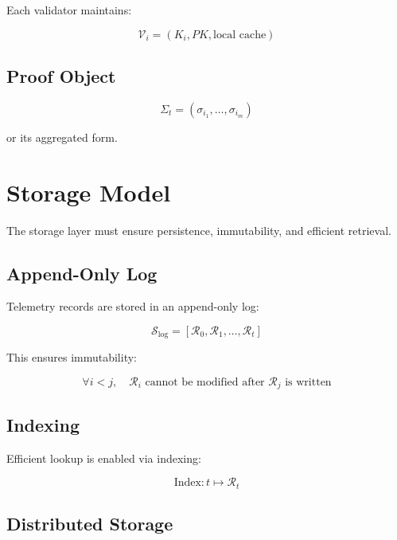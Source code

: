 Each validator maintains:

\begin{equation}
\mathcal{V}_i = (K_i, PK, \text{local cache})
\end{equation}

\subsection{Proof Object}

\begin{equation}
\Sigma_t = (\sigma_{i_1}, \dots, \sigma_{i_m})
\end{equation}

or its aggregated form.

\section{Storage Model}

The storage layer must ensure persistence, immutability, and efficient retrieval.

\subsection{Append-Only Log}

Telemetry records are stored in an append-only log:

\begin{equation}
\mathcal{S}_{\text{log}} = [\mathcal{R}_0, \mathcal{R}_1, \dots, \mathcal{R}_t]
\end{equation}

This ensures immutability:

\begin{equation}
\forall i < j, \quad \mathcal{R}_i \text{ cannot be modified after } \mathcal{R}_j \text{ is written}
\end{equation}

\subsection{Indexing}

Efficient lookup is enabled via indexing:

\begin{equation}
\text{Index}: t \mapsto \mathcal{R}_t
\end{equation}

\subsection{Distributed Storage}

